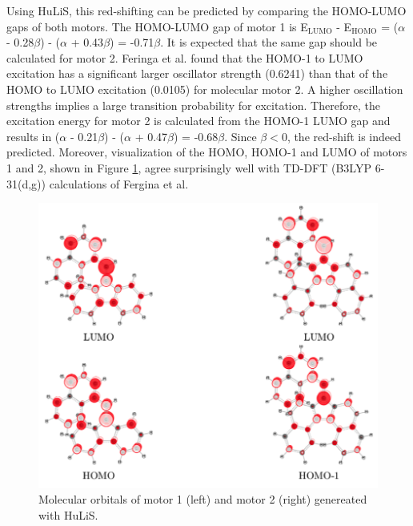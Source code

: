 \documentclass{article}
\begin{document}
Using HuLiS, this red-shifting can be predicted by comparing the HOMO-LUMO gaps of both motors. The HOMO-LUMO gap of motor 1 is E$_\text{LUMO}$ - E$_\text{HOMO}$ = ($\alpha$ - 0.28$\beta$) - ($\alpha$ + 0.43$\beta$) = -0.71$\beta$. It is expected that the same gap should be calculated for motor 2. Feringa et al. found that the HOMO-1 to LUMO excitation has a significant larger oscillator strength (0.6241) than that of the HOMO to LUMO excitation (0.0105) for molecular motor 2. A higher oscillation strengths implies a large transition probability for excitation. Therefore, the excitation energy for motor 2 is calculated from the HOMO-1 LUMO gap and results in ($\alpha$ - 0.21$\beta$) - ($\alpha$ + 0.47$\beta$) = -0.68$\beta$. Since $\beta {<} 0$, the red-shift is indeed predicted. Moreover, visualization of the HOMO, HOMO-1 and LUMO of motors 1 and 2, shown in Figure \ref{fig:hulis_orbitals}, agree surprisingly well with TD-DFT (B3LYP 6-31(d,g)) calculations of Fergina et al.

\begin{figure}[h]
\centering
\includegraphics[scale=0.75]{./images/hulis_mm.png}
\caption{Molecular orbitals of motor 1 (left) and motor 2 (right) genereated with HuLiS.}
\label{fig:hulis_orbitals}
\end{figure} 

               
    
\end{document}
